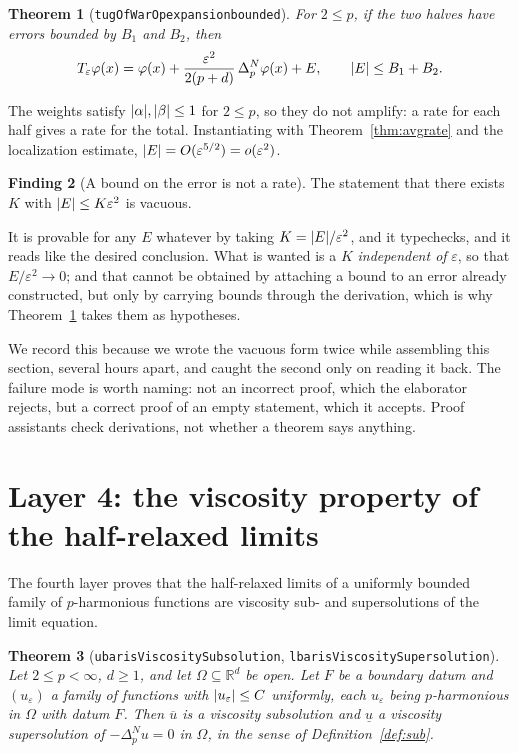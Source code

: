 \documentclass[11pt,reqno]{amsart}
\newcommand{\LEANREF}[1]{\texttt{\small\def\_{\textunderscore\allowbreak}#1}}
\newcommand{\R}{\mathbb{R}}
\newcommand{\eps}{\varepsilon}
\newcommand{\pnlap}{\Delta_p^{N}}
\newcommand{\Op}{T_\eps}
\DeclarePairedDelimiter{\abs}{\lvert}{\rvert}
\theoremstyle{plain}
\newtheorem{theorem}{Theorem}[section]
\theoremstyle{definition}
\newtheorem{finding}[theorem]{Finding}
\begin{document}
\begin{theorem}[\LEANREF{tugOfWarOp\_expansion\_bounded}]\label{thm:opbounded}
For $2 \le p$, if the two halves have errors bounded by $B_1$ and $B_2$, then
\[
  \Op\varphi(x) = \varphi(x)
    + \frac{\eps^2}{2(p+d)}\,\pnlap\varphi(x) + E ,
  \qquad \abs{E} \le B_1 + B_2 .
\]
\end{theorem}

The weights satisfy $\abs{\alpha}, \abs{\beta} \le 1$ for $2 \le p$, so they do
not amplify: a rate for each half gives a rate for the total. Instantiating
with Theorem~\ref{thm:avgrate} and the localization estimate,
$\abs{E} = O(\eps^{5/2}) = o(\eps^2)$.

\begin{finding}[A bound on the error is not a rate]\label{find:vacuous}
The statement that there exists $K$ with $\abs{E} \le K\eps^2$ is vacuous.
\end{finding}

It is provable for any $E$ whatever by taking $K = \abs{E}/\eps^2$, and it
typechecks, and it reads like the desired conclusion. What is wanted is a $K$
\emph{independent of} $\eps$, so that $E/\eps^2 \to 0$; and that cannot be
obtained by attaching a bound to an error already constructed, but only by
carrying bounds through the derivation, which is why
Theorem~\ref{thm:opbounded} takes them as hypotheses.

We record this because we wrote the vacuous form twice while assembling this
section, several hours apart, and caught the second only on reading it back.
The failure mode is worth naming: not an incorrect proof, which the elaborator
rejects, but a correct proof of an empty statement, which it accepts. Proof
assistants check derivations, not whether a theorem says anything.

\section{Layer 4: the viscosity property of the half-relaxed limits}\label{sec:layer4}

The fourth layer proves that the half-relaxed limits of a uniformly bounded
family of $p$-harmonious functions are viscosity sub- and supersolutions of the
limit equation.

\begin{theorem}[\LEANREF{ubar\_isViscositySubsolution},
\LEANREF{lbar\_isViscositySupersolution}]\label{thm:main4}
Let $2 \le p < \infty$, $d \ge 1$, and let $\Omega \subseteq \R^d$ be open.
Let $F$ be a boundary datum and $(u_\eps)$ a family of functions with
$\abs{u_\eps} \le C$ uniformly, each $u_\eps$ being $p$-harmonious in $\Omega$
with datum $F$. Then $\overline{u}$ is a viscosity subsolution and
$\underline{u}$ a viscosity supersolution of $-\pnlap u = 0$ in $\Omega$, in
the sense of Definition~\ref{def:sub}.
\end{theorem}
\end{document}
